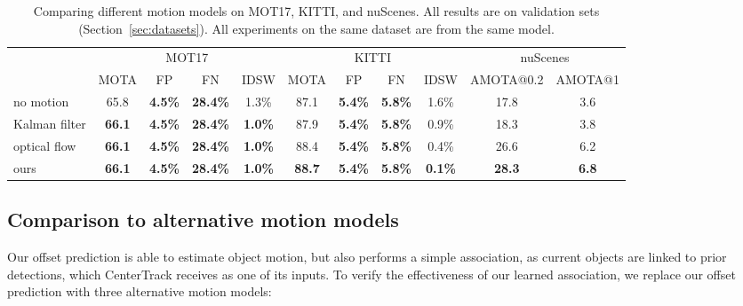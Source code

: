 \documentclass[runningheads]{llncs}
\newcommand{\lblsec}[1]{\label{sec:#1}}
\newcommand{\lbltab}[1]{\label{tbl:#1}}
\newcommand{\refsec}[1]{Section~\ref{sec:#1}}
\begin{document}
\begin{table}[t]
{\center 
\small
\begin{tabular}{@{}l@{\ }c@{\ \ }c@{\ \ }c@{\ }c@{\ \ }c@{\ \ }c@{\ }c@{\ }c@{\ }c@{}c@{}}
\toprule
 & \multicolumn{4}{c}{MOT17} & \multicolumn{4}{c}{KITTI} & \multicolumn{2}{c}{nuScenes}\\
 & {\scriptsize MOTA} & {\scriptsize FP} & {\scriptsize FN} & {\scriptsize IDSW} & {\scriptsize MOTA}  & {\scriptsize FP} & {\scriptsize FN} & {\scriptsize IDSW} & {\scriptsize AMOTA@0.2} & {\scriptsize AMOTA@1} \\
\cmidrule(r){1-1}
\cmidrule(r){2-5}
\cmidrule(r){6-9}
\cmidrule(){10-11}
no motion & 65.8 & \textbf{4.5\%} & \textbf{28.4\%} & 1.3\% 
& 87.1 & \textbf{5.4\%} & \textbf{5.8\%} & 1.6\% & 17.8 & 3.6 \\
Kalman filter & \textbf{66.1} & \textbf{4.5\%} & \textbf{28.4\%} & \textbf{1.0\%} 
& 87.9 & \textbf{5.4\%} & \textbf{5.8\%} & 0.9\% & 18.3 & 3.8 \\
optical flow &  \textbf{66.1} & \textbf{4.5\%} & \textbf{28.4\%} & \textbf{1.0\%} 
& 88.4 & \textbf{5.4\%} & \textbf{5.8\%} & 0.4\% & 26.6 & 6.2\\
ours & \textbf{66.1} & \textbf{4.5\%} & \textbf{28.4\%} & \textbf{1.0\%} 
& \textbf{88.7} & \textbf{5.4\%} & \textbf{5.8\%} & \textbf{0.1\%} & \textbf{28.3} & \textbf{6.8} \\
\bottomrule
\end{tabular}
\small
\caption{Comparing different motion models on MOT17, KITTI, and nuScenes. All results are on validation sets (\refsec{datasets}). All experiments on the same dataset are from the same model.}
\lbltab{motion}
}
\vspace{-7mm}
\end{table}

\vspace{-5mm}

\subsection{Comparison to alternative motion models}

\lblsec{motion}

Our offset prediction is able to estimate object motion, but also performs a simple association, as current objects are linked to prior detections, which CenterTrack receives as one of its inputs.
To verify the effectiveness of our learned association, we replace our offset prediction with three alternative motion models:
\end{document}
